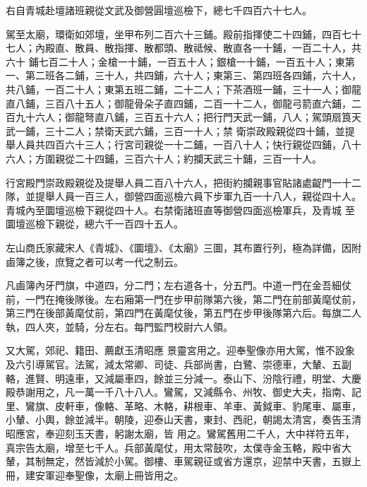 \begin{pinyinscope}
 右自青城赴壇諸班親從文武及御營圓壇巡檢下，總七千四百六十七人。



 駕至太廟，環衛如郊壇，坐甲布列二百六十三鋪。殿前指揮使二十四鋪，四百七十七人；內殿直、散員、散指揮、散都頭、散祗候、散直各一十鋪，一百二十人，共六十
 鋪七百二十人；金槍一十鋪，一百五十人；銀槍一十鋪，一百五十人；東第一、第二班各二鋪，三十人，共四鋪，六十人；東第三、第四班各四鋪，六十人，共八鋪，一百二十人；東第五班二鋪，二十二人；下茶酒班一鋪，三十一人；御龍直八鋪，三百八十五人；御龍骨朵子直四鋪，二百一十二人，御龍弓箭直六鋪，二百九十六人；御龍弩直八鋪，三百五十六人；把行門天武一鋪，八人；駕頭扇筤天武一鋪，三十二人；禁衛天武六鋪，三百一十人；禁
 衛崇政殿親從四十鋪，並提舉人員共四百六十三人；行宮司親從一十二鋪，一百八十人；快行親從四鋪，八十六人；方圍親從二十四鋪，三百六十人；約攔天武三十鋪，三百一十人。



 行宮殿門崇政殿親從及提舉人員二百八十六人，把街約攔親事官貼諸處齪門一十二隊，並提舉人員一百三人，御營四面巡檢六員下步軍九百一十八人，親從四十人。青城內至圜壇巡檢下親從四十人。右禁衛諸班直等御營四面巡檢軍兵，及青城
 至圜壇巡檢下親從，總六千一百四十五人。



 左山商氏家藏宋人《青城》、《圜壇》、《太廟》三圖，其布置行列，極為詳備，因附鹵簿之後，庶覽之者可以考一代之制云。



 凡鹵簿內牙門旗，中道四，分二門；左右道各十，分五門。中道一門在金吾細仗前，一門在掩後隊後。左右廂第一門在步甲前隊第六後，第二門在前部黃麾仗前，第三門在後部黃麾仗前，第四門在黃麾仗後，第五門在步甲後隊第六后。每旗二人執，四人夾，並騎，分左右。每門監門校尉六人領。



 又大駕，郊祀、籍田、薦獻玉清昭應
 景靈宮用之。迎奉聖像亦用大駕，惟不設象及六引導駕官。法駕，減太常卿、司徒、兵部尚書，白鷺、崇德車，大輦、五副輅，進賢、明遠車，又減屬車四，餘並三分減一。泰山下、汾陰行禮，明堂、大慶殿恭謝用之，凡一萬一千八十八人。鸞駕，又減縣令、州牧、御史大夫，指南、記里、鸞旗、皮軒車，像輅、革略、木輅，耕根車、羊車、黃鉞車、豹尾車、屬車，小輦、小輿，餘並減半。朝陵，迎泰山天書，東封、西祀，朝謁太清宮，奏告玉清昭應宮，奉迎刻玉天書，躬謝太廟，皆
 用之。鸞駕舊用二千人，大中祥符五年，真宗告太廟，增至七千人。兵部黃麾仗，用太常鼓吹，太僕寺金玉輅，殿中省大輦，其制無定，然皆減於小駕。御樓、車駕親征或省方還京，迎禁中天書，五嶽上冊，建安軍迎奉聖像，太廟上冊皆用之。



\end{pinyinscope}